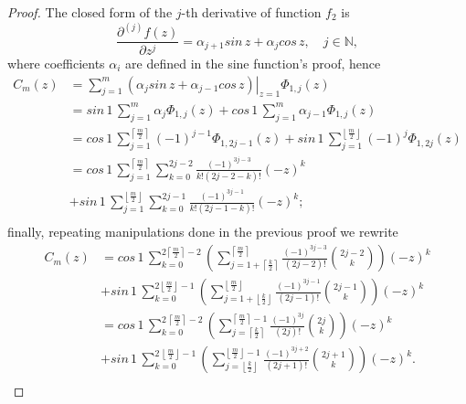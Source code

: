 \begin{proof}
The closed form of the $j$-th derivative of function $f_{2}$ is
$$\frac{\partial^{(j)}{f}(z)}{\partial{z}^{j}} = \alpha_{j+1}sin\,{z} +
\alpha_{j}cos\,{z}, \quad j\in\mathbb{N},$$ where coefficients $\alpha_{i}$
are defined in the sine function's proof, hence 
\begin{displaymath}
\begin{split}
  C_{m}(z) &= \sum_{j=1}^{m}{ \left. \left(\alpha_{j}sin\,{z} + \alpha_{j-1}cos\,{z}\right) \right|_{z=1}\Phi_{1,j}(z)} \\
       &= sin\,{1}\,\sum_{j=1}^{m}{ \alpha_{j}\Phi_{1,j}(z)} + cos\,{1}\,\sum_{j=1}^{m}{ \alpha_{j-1}\Phi_{1,j}(z)} \\
       &= cos\,{1}\,\sum_{j=1}^{\left\lceil \frac{m}{2} \right\rceil}{ (-1)^{j-1}\Phi_{1,2j-1}(z)}
        + sin\,{1}\,\sum_{j=1}^{\left\lfloor \frac{m}{2} \right\rfloor}{ (-1)^{j}\Phi_{1,2j}(z)} \\
       &= cos\,{1}\,\sum_{j=1}^{\left\lceil \frac{m}{2} \right\rceil}{\sum_{k=0}^{2j-2}{ \frac{(-1)^{3j-3}}{k!(2j-2-k)!}{(-z)^{k}}} }\\
       &+ sin\,{1}\,\sum_{j=1}^{\left\lfloor \frac{m}{2} \right\rfloor}{\sum_{k=0}^{2j-1}{ \frac{(-1)^{3j-1}}{k!(2j-1-k)!}{(-z)^{k}}}}; \\
\end{split}
\end{displaymath}
\noindent finally, repeating manipulations done in the previous proof we rewrite
\begin{displaymath}
\begin{split}
  C_{m}(z)  &= cos\,{1}\,\sum_{k=0}^{2 \left\lceil \frac{m}{2} \right\rceil-2}{\left(\sum_{j=1+\left\lceil \frac{k}{2}\right\rceil}^{\left\lceil \frac{m}{2} \right\rceil}{\frac{(-1)^{3j-3}}{(2j-2)!}{2j-2\choose k}}\right) {(-z)^{k}}}\\
            &+ sin\,{1}\,\sum_{k=0}^{2 \left\lfloor \frac{m}{2} \right\rfloor-1}{\left(\sum_{j=1+\left\lfloor \frac{k}{2}\right\rfloor}^{\left\lfloor \frac{m}{2} \right\rfloor}{ \frac{(-1)^{3j-1}}{(2j-1)!} {2j-1\choose k}}\right){(-z)^{k}}} \\
            &= cos\,{1}\,\sum_{k=0}^{2\,\left\lceil \frac{m}{2} \right\rceil-2}{\left(\sum_{j=\left\lceil \frac{k}{2}\right\rceil}^{\left\lceil \frac{m}{2} \right\rceil -1}{\frac{(-1)^{3j}}{(2j)!}{2j\choose k}}\right) {(-z)^{k}}}\\
            &+ sin\,{1}\,\sum_{k=0}^{2\,\left\lfloor \frac{m}{2} \right\rfloor-1}{\left(\sum_{j=\left\lfloor \frac{k}{2}\right\rfloor}^{\left\lfloor \frac{m}{2} \right\rfloor -1}{\frac{(-1)^{3j+2}}{(2j + 1)!} {2j+1\choose k}}\right){(-z)^{k}}}. \\
\end{split}
\end{displaymath}
\end{proof}

